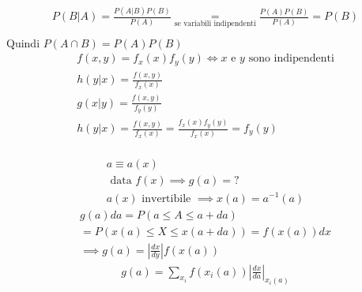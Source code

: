 \documentclass[a4paper, oneside]{article}
\begin{document}
\begin{theorem}
    \begin{gather*}
        P(B|A) = \frac{P(A|B) P(B)}{P(A)} \underset{\text{se variabili indipendenti}}{=} \frac{P(A) P(B)}{P(A)} = P(B)\\
    \end{gather*}
    Quindi $P(A \cap B) = P(A) P(B)$
    \begin{gather*}
        \boxed{f(x,y) = f_x(x) f_y(y) \Leftrightarrow x \text{ e } y \text{ sono indipendenti}}\\
        h(y|x) = \frac{f(x,y)}{f_x(x)}\\
        g(x|y) = \frac{f(x,y)}{f_y(y)}\\
        h(y|x) = \frac{f(x,y)}{f_x(x)} = \frac{f_x(x) f_y(y)}{f_x(x)} = f_y(y)\\
    \end{gather*}
\end{theorem}

\begin{example}
    \begin{gather*}
        a \equiv a(x) \\
        \text{ data } f(x) \implies g(a) = ?\\
        a(x) \text{ invertibile } \implies x(a) = a^{-1}(a)
    \end{gather*}
    \begin{gather*}
        g(a) da = P(a \leq A \leq a + da)\\
        = P(x(a) \leq X \leq x (a + da)) = f(x(a)) dx\\ 
        \implies \boxed{g(a) = \left\lvert \frac{dx}{dy}\right\rvert f(x(a))}
    \end{gather*}
    \begin{gather*}
        g(a) = \sum_{x_i} f(x_i(a)) \left\lvert \frac{dx}{da} \right\rvert_{x_i(a)}\\
    \end{gather*}
\end{example}
\end{document}
